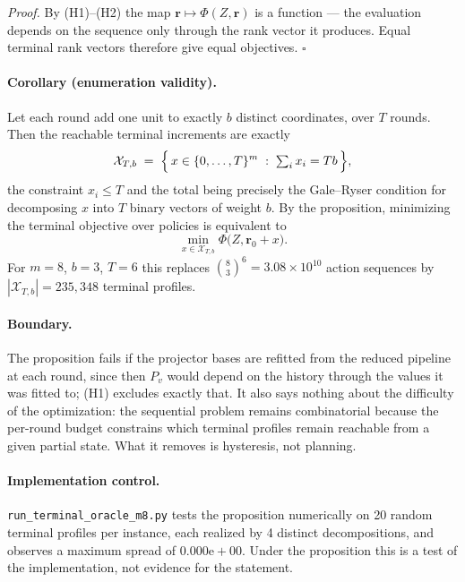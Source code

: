 \emph{Proof.} By (H1)--(H2) the map $\mathbf r \mapsto \Phi(Z,\mathbf r)$ is a
function --- the evaluation depends on the sequence only through the rank
vector it produces. Equal terminal rank vectors therefore give equal
objectives. $\square$

\paragraph{Corollary (enumeration validity).}
Let each round add one unit to exactly $b$ distinct coordinates, over $T$
rounds. Then the reachable terminal increments are exactly
\[
  \mathcal X_{T,b}
  \;=\;
  \Bigl\{\,x \in \{0,\dots,T\}^m \;:\; \textstyle\sum_i x_i = Tb \,\Bigr\},
\]
the constraint $x_i \le T$ and the total being precisely the Gale--Ryser
condition for decomposing $x$ into $T$ binary vectors of weight $b$. By the
proposition, minimizing the terminal objective over policies is equivalent to
\[
  \boxed{\;\min_{x \in \mathcal X_{T,b}} \Phi\bigl(Z, \mathbf r_0 + x\bigr).\;}
\]
For $m=8$, $b=3$, $T=6$ this replaces $\binom{8}{3}^6 = 3.08\times10^{10}$
action sequences by $|\mathcal X_{T,b}| = 235{,}348$ terminal profiles.

\paragraph{Boundary.}
The proposition fails if the projector bases are refitted from the reduced
pipeline at each round, since then $P_v$ would depend on the history through
the values it was fitted to; (H1) excludes exactly that. It also says nothing
about the difficulty of the optimization: the sequential problem remains
combinatorial because the per-round budget constrains which terminal profiles
remain reachable from a given partial state. What it removes is hysteresis, not
planning.

\paragraph{Implementation control.}
\texttt{run\_terminal\_oracle\_m8.py} tests the proposition numerically on 20
random terminal profiles per instance, each realized by 4 distinct
decompositions, and observes a maximum spread of $0.000\mathrm{e}{+}00$. Under
the proposition this is a test of the implementation, not evidence for the
statement.
